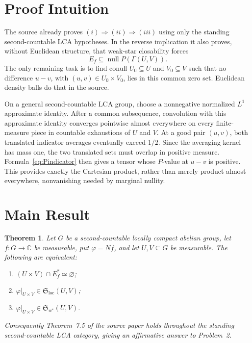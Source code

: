 \documentclass[11pt]{article}
\newtheorem{theorem}{Theorem}
\newcommand{\CC}{\mathbb C}
\newcommand{\nul}{\operatorname{null}}
\newcommand{\Sloc}{\mathfrak S_{\mathrm{loc}}}
\newcommand{\Sw}{\mathfrak S_{w^*}}
\begin{document}
\section*{Proof Intuition}

The source already proves \((i)\Rightarrow(ii)\Rightarrow(iii)\) using only
the standing second-countable LCA hypotheses.  In the reverse implication it
also proves, without Euclidean structure, that weak-star closability forces
\[
 E_f\subseteq \nul P(\Gamma(U,V)).
\]
The only remaining task is to find conull \(U_0\subseteq U\) and
\(V_0\subseteq V\) such that no difference \(u-v\), with
\((u,v)\in U_0\times V_0\), lies in this common zero set.  Euclidean density
balls do that in the source.

On a general second-countable LCA group, choose a nonnegative normalized
\(L^1\) approximate identity.  After a common subsequence, convolution with
this approximate identity converges pointwise almost everywhere on every
finite-measure piece in countable exhaustions of \(U\) and \(V\).  At a good
pair \((u,v)\), both translated indicator averages eventually exceed
\(1/2\).  Since the averaging kernel has mass one, the two translated sets
must overlap in positive measure.  Formula~\eqref{eq:Pindicator} then gives a
tensor whose \(P\)-value at \(u-v\) is positive.  This provides exactly the
Cartesian-product, rather than merely product-almost-everywhere,
nonvanishing needed by marginal nullity.

\section*{Main Result}

\begin{theorem}\label{thm:main}
Let \(G\) be a second-countable locally compact abelian group, let
\(f:G\to\CC\) be measurable, put \(\varphi=Nf\), and let
\(U,V\subseteq G\) be measurable.  The following are equivalent:
\begin{enumerate}
\item \((U\times V)\cap E_f^*\simeq\varnothing\);
\item \(\varphi|_{U\times V}\in\Sloc(U,V)\);
\item \(\varphi|_{U\times V}\in\Sw(U,V)\).
\end{enumerate}
Consequently Theorem~7.5 of the source paper holds throughout the standing
second-countable LCA category, giving an affirmative answer to Problem~2.
\end{theorem}
\end{document}
